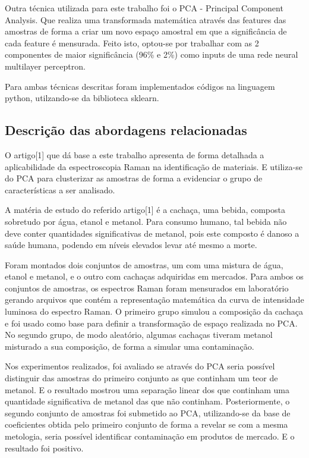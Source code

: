 \documentclass{article}
\begin{document}
\vspace{4cm}
Outra técnica utilizada para este trabalho foi o PCA - Principal Component Analysis. Que realiza uma transformada matemática através das features das amostras de forma a criar um novo espaço amostral em que a significância de cada feature é mensurada. Feito isto, optou-se por trabalhar com as 2 componentes de maior significância (96\% e 2\%) como inputs de uma rede neural multilayer perceptron.

Para ambas técnicas descritas foram implementados códigos na linguagem python, utilzando-se da biblioteca sklearn.

\subsection{Descrição das abordagens relacionadas}
\vspace{1cm} O artigo[1] que dá base a este trabalho apresenta de forma detalhada a aplicabilidade da espectroscopia Raman na identificação de materiais. E utiliza-se do PCA para clusterizar as amostras de forma a evidenciar o grupo de características a ser analisado.

A matéria de estudo do referido artigo[1] é a cachaça, uma bebida, composta sobretudo por água, etanol e metanol. Para consumo humano, tal bebida não deve conter quantidades significativas de metanol, pois este composto é danoso a saúde humana, podendo em níveis elevados levar até mesmo a morte.

Foram montados dois conjuntos de amostras, um com uma mistura de água, etanol e metanol, e o outro com cachaças adquiridas em mercados. Para ambos os conjuntos de amostras, os espectros Raman foram mensurados em laboratório gerando arquivos que contém a representação matemática da curva de intensidade luminosa do espectro Raman. O primeiro grupo simulou a composição da cachaça e foi usado como base para definir a transformação de espaço realizada no PCA. No segundo grupo, de modo aleatório, algumas cachaças tiveram metanol misturado a sua composição, de forma a simular uma contaminação.

Nos experimentos realizados, foi avaliado se através do PCA seria possível distinguir das amostras do primeiro conjunto as que continham um teor de metanol. E o resultado mostrou uma separação linear dos que continham uma quantidade significativa de metanol das que não continham. Posteriormente, o segundo conjunto de amostras foi submetido ao PCA, utilizando-se da base de coeficientes obtida pelo primeiro conjunto de forma a revelar se com a mesma metologia, seria possível identificar contaminação em produtos de mercado. E o resultado foi positivo.
\end{document}
